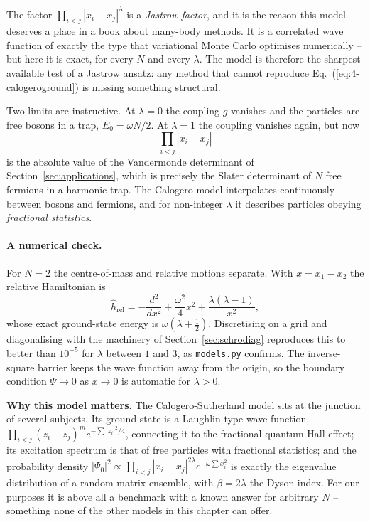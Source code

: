 The factor $\prod_{i<j}|x_i-x_j|^{\lambda}$ is a \emph{Jastrow factor}, and it
is the reason this model deserves a place in a book about many-body methods.
It is a correlated wave function of exactly the type that variational Monte
Carlo optimises numerically -- but here it is exact, for every $N$ and every
$\lambda$.  The model is therefore the sharpest available test of a Jastrow
ansatz: any method that cannot reproduce Eq.~(\ref{eq:4-calogeroground}) is
missing something structural.

Two limits are instructive.  At $\lambda=0$ the coupling $g$ vanishes and the
particles are free bosons in a trap, $E_0=\omega N/2$.  At $\lambda=1$ the
coupling vanishes again, but now
\begin{equation}
  \prod_{i<j}|x_i-x_j|
  \label{eq:4-vandermonde}
\end{equation}
is the absolute value of the Vandermonde determinant of
Section~\ref{sec:applications}, which is precisely the Slater determinant of
$N$ free fermions in a harmonic trap.  The Calogero model interpolates
continuously between bosons and fermions, and for non-integer $\lambda$ it
describes particles obeying \emph{fractional statistics}.

\paragraph{A numerical check.}
For $N=2$ the centre-of-mass and relative motions separate.  With
$x=x_1-x_2$ the relative Hamiltonian is
\begin{equation}
  \hat{h}_{\mathrm{rel}} = -\frac{d^2}{dx^2}
    + \frac{\omega^2}{4}x^2 + \frac{\lambda(\lambda-1)}{x^2},
  \label{eq:4-calogerorel}
\end{equation}
whose exact ground-state energy is $\omega(\lambda+\tfrac12)$.  Discretising
on a grid and diagonalising with the machinery of
Section~\ref{sec:schrodiag} reproduces this to better than $10^{-5}$ for
$\lambda$ between $1$ and $3$, as \texttt{models.py} confirms.  The
inverse-square barrier keeps the wave function away from the origin, so the
boundary condition $\Psi\rightarrow0$ as $x\rightarrow0$ is automatic for
$\lambda>0$.

\begin{notebox}
\textbf{Why this model matters.} The Calogero-Sutherland model sits at the
junction of several subjects.  Its ground state is a Laughlin-type wave
function, $\prod_{i<j}(z_i-z_j)^m e^{-\sum|z_i|^2/4}$, connecting it to the
fractional quantum Hall effect; its excitation spectrum is that of free
particles with fractional statistics; and the probability density
$|\Psi_0|^2\propto\prod_{i<j}|x_i-x_j|^{2\lambda}e^{-\omega\sum x_i^2}$ is
exactly the eigenvalue distribution of a random matrix ensemble, with
$\beta=2\lambda$ the Dyson index.  For our purposes it is above all a
benchmark with a known answer for arbitrary $N$ -- something none of the other
models in this chapter can offer.
\end{notebox}

